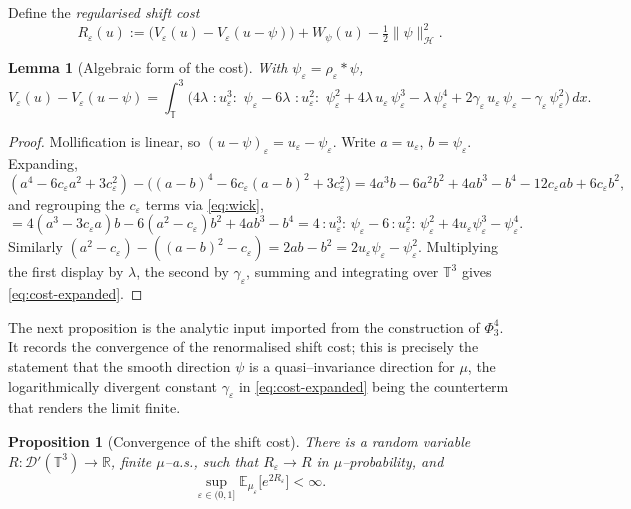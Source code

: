 \documentclass[12pt]{article}
\newtheorem{lemma}{Lemma}
\newtheorem{proposition}{Proposition}
\theoremstyle{definition}
\newcommand{\T}{\mathbb{T}^3}
\newcommand{\R}{\mathbb{R}}
\newcommand{\E}{\mathbb{E}}
\newcommand{\D}{\mathcal{D}'(\T)}
\newcommand{\Wick}[1]{\,{:}#1{:}\,}
\begin{document}
Define the \emph{regularised shift cost}
\begin{equation}\label{eq:Reps}
  R_\varepsilon(u):=\big(V_\varepsilon(u)-V_\varepsilon(u-\psi)\big)+W_\psi(u)-\tfrac12\|\psi\|_{\mathcal H}^2 .
\end{equation}

\begin{lemma}[Algebraic form of the cost]\label{lem:algebra}
With $\psi_\varepsilon=\rho_\varepsilon*\psi$,
\begin{equation}\label{eq:cost-expanded}
  V_\varepsilon(u)-V_\varepsilon(u-\psi)
  =\int_\T\Big(
    4\lambda\,\Wick{u_\varepsilon^3}\,\psi_\varepsilon
    -6\lambda\,\Wick{u_\varepsilon^2}\,\psi_\varepsilon^2
    +4\lambda\,u_\varepsilon\,\psi_\varepsilon^3
    -\lambda\,\psi_\varepsilon^4
    +2\gamma_\varepsilon\,u_\varepsilon\,\psi_\varepsilon
    -\gamma_\varepsilon\,\psi_\varepsilon^2
  \Big)\,dx .
\end{equation}
\end{lemma}

\begin{proof}
Mollification is linear, so $(u-\psi)_\varepsilon=u_\varepsilon-\psi_\varepsilon$. Write
$a=u_\varepsilon$, $b=\psi_\varepsilon$. Expanding,
\[
  (a^4-6c_\varepsilon a^2+3c_\varepsilon^2)-\big((a-b)^4-6c_\varepsilon(a-b)^2+3c_\varepsilon^2\big)
  =4a^3b-6a^2b^2+4ab^3-b^4-12c_\varepsilon ab+6c_\varepsilon b^2 ,
\]
and regrouping the $c_\varepsilon$ terms via \eqref{eq:wick},
\[
  =4(a^3-3c_\varepsilon a)b-6(a^2-c_\varepsilon)b^2+4ab^3-b^4
  =4\Wick{u_\varepsilon^3}\psi_\varepsilon-6\Wick{u_\varepsilon^2}\psi_\varepsilon^2
   +4u_\varepsilon\psi_\varepsilon^3-\psi_\varepsilon^4 .
\]
Similarly $(a^2-c_\varepsilon)-((a-b)^2-c_\varepsilon)=2ab-b^2=2u_\varepsilon\psi_\varepsilon-\psi_\varepsilon^2$.
Multiplying the first display by $\lambda$, the second by $\gamma_\varepsilon$, summing and
integrating over $\T$ gives \eqref{eq:cost-expanded}.
\end{proof}

The next proposition is the analytic input imported from the construction of $\Phi^4_3$.
It records the convergence of the renormalised shift cost; this is precisely the statement
that the smooth direction $\psi$ is a quasi--invariance direction for $\mu$, the
logarithmically divergent constant $\gamma_\varepsilon$ in \eqref{eq:cost-expanded} being
the counterterm that renders the limit finite.

\begin{proposition}[Convergence of the shift cost]\label{prop:cost}
There is a random variable $R\colon\D\to\R$, finite $\mu$--a.s., such that
$R_\varepsilon\to R$ in $\mu$--probability, and
\begin{equation}\label{eq:UI}
  \sup_{\varepsilon\in(0,1]}\E_{\mu_\varepsilon}\!\big[e^{2R_\varepsilon}\big]<\infty .
\end{equation}
\end{proposition}
\end{document}
